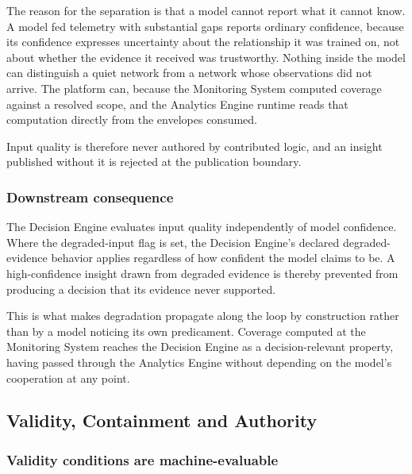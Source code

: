 The reason for the separation is that a model cannot report what it
cannot know. A model fed telemetry with substantial gaps reports
ordinary confidence, because its confidence expresses uncertainty about
the relationship it was trained on, not about whether the evidence it
received was trustworthy. Nothing inside the model can distinguish a
quiet network from a network whose observations did not arrive. The
platform can, because the Monitoring System computed coverage against a
resolved scope, and the Analytics Engine runtime reads that computation
directly from the envelopes consumed.

Input quality is therefore never authored by contributed logic, and an
insight published without it is rejected at the publication boundary.

\hypertarget{downstream-consequence}{%
\subsubsection{Downstream consequence}\label{downstream-consequence}}

The Decision Engine evaluates input quality independently of model
confidence. Where the degraded-input flag is set, the Decision Engine's
declared degraded-evidence behavior applies regardless of how confident
the model claims to be. A high-confidence insight drawn from degraded
evidence is thereby prevented from producing a decision that its
evidence never supported.

This is what makes degradation propagate along the loop by construction
rather than by a model noticing its own predicament. Coverage computed
at the Monitoring System reaches the Decision Engine as a
decision-relevant property, having passed through the Analytics Engine
without depending on the model's cooperation at any point.

\hypertarget{validity-containment-and-authority}{%
\subsection{Validity, Containment and Authority}\label{validity-containment-and-authority}}

\hypertarget{validity-conditions-are-machine-evaluable}{%
\subsubsection{Validity conditions are machine-evaluable}\label{validity-conditions-are-machine-evaluable}}

